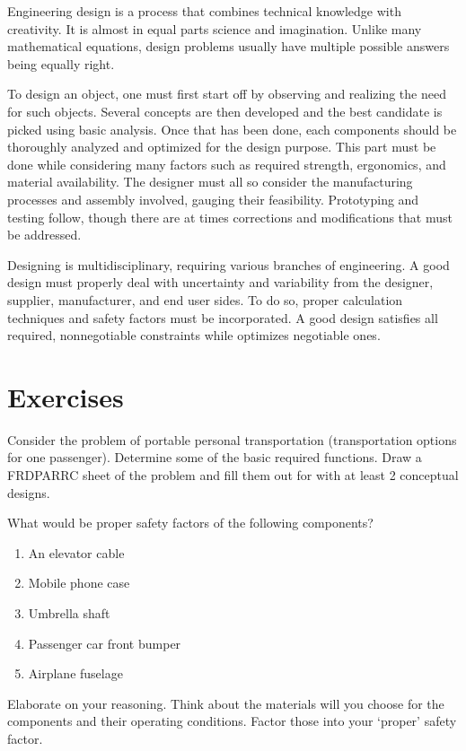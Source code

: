 \documentclass[
10pt,
a4paper,
openany,
svgnames,
]{book}
\newcommand{\exercise}{%
\item \label{lab:\arabic{chapter}-\arabic{exercisesi}}  %
}
\begin{document}
Engineering design is a process that combines technical knowledge with creativity. It is almost in equal parts science and imagination. Unlike many mathematical equations, design problems usually have multiple possible answers being equally right.

To design an object, one must first start off by observing and realizing the need for such objects. Several concepts are then developed and the best candidate is picked using basic analysis. Once that has been done, each components should be thoroughly analyzed and optimized for the design purpose. This part must be done while considering many factors such as required strength, ergonomics, and material availability. The designer must all so consider the manufacturing processes and assembly involved, gauging their feasibility. Prototyping and testing follow, though there are at times corrections and modifications that must be addressed.

Designing is multidisciplinary, requiring various branches of engineering. A good design must properly deal with uncertainty and variability from the designer, supplier, manufacturer, and end user sides. To do so, proper calculation techniques and safety factors must be incorporated. A good design satisfies all required, nonnegotiable constraints while optimizes negotiable ones.

\section*{Exercises}

\begin{exercises}
  
  \exercise Consider the problem of portable personal transportation (transportation options for one passenger). Determine some of the basic required functions. Draw a FRDPARRC sheet of the problem and fill them out for with at least 2 conceptual designs.

  \exercise What would be proper safety factors of the following components?
  \begin{enumerate}
  \item An elevator cable
  \item Mobile phone case
  \item Umbrella shaft
  \item Passenger car front bumper
  \item Airplane fuselage
  \end{enumerate}
  Elaborate on your reasoning. Think about the materials will you choose for the components and their operating conditions. Factor those into your ‘proper’ safety factor.

\end{exercises}
\end{document}
